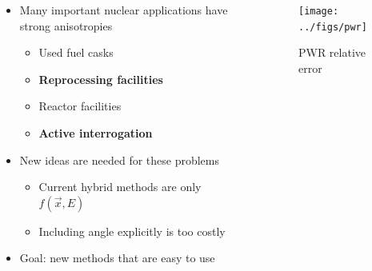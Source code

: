 \documentclass[xcolor=x11names,compress]{beamer}
\renewcommand{\(}{\begin{columns}}
\renewcommand{\)}{\end{columns}}
\newcommand{\<}[1]{\begin{column}{#1}}
\renewcommand{\>}{\end{column}}
\begin{document}
\begin{frame}[fragile]
	\begin{columns}
  	\begin{column}{0.5\textwidth}
	\begin{itemize}
	\item Many important nuclear applications have strong anisotropies
	 \begin{itemize}
	 \item Used fuel casks
	 \item \textbf{Reprocessing facilities}
	 \item Reactor facilities
	 \item \textbf{Active interrogation} 
	 \end{itemize}
	\pause
	\item New ideas are needed for these problems
	\begin{itemize}
	\item Current hybrid methods are only $f(\vec{x}, E)$
	\item Including angle explicitly is too costly	
	\end{itemize}
	\pause
	\item \alert{Goal}: new methods that are easy to use
	\end{itemize}
  	\end{column}
 	\begin{column}{0.5\textwidth}
 	 \begin{center}
 	 \begin{figure}
 	 \texttt{[image: ../figs/pwr]}  
 	 \caption{PWR relative error \cite{Pantelias2013}}
 	 \end{figure}
 	 \end{center}

  	\end{column}
	\end{columns}

\end{frame}
\end{document}
